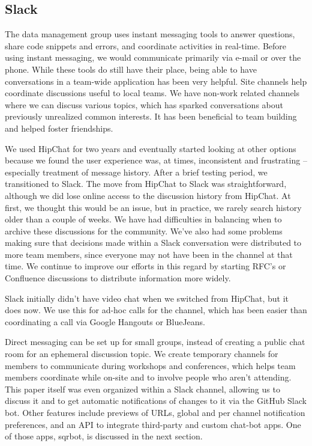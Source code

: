 \subsection{Slack}
\label{sec:slack}

The data management group uses instant messaging tools  to answer questions,
share code snippets and errors, and coordinate activities in real-time.
Before using instant messaging, we would communicate primarily via e-mail or
over the phone. While these tools do still have their place, being able to have
conversations in a team-wide application has been very helpful.
Site channels help coordinate discussions
useful to local teams.  We have non-work related channels where we can
discuss various topics, which has sparked conversations about previously
unrealized common interests. It has been beneficial to team building and
helped foster friendships.


We used HipChat for two years and eventually started looking at other options
because we found the user experience was, at times, inconsistent and
frustrating -- especially treatment of message history.
After a brief testing period, we transitioned to Slack.
The move from HipChat to Slack was straightforward,
although we did lose online access to the discussion history from HipChat.  At first, we
thought this would be an issue, but in practice, we rarely search history older
than a couple of weeks.  We have had difficulties in balancing when to
archive these discussions for the community.  We've also had some problems
making sure that decisions made within a Slack conversation were
distributed to more team members, since everyone may not have been in the
channel at that time.  We continue to improve our efforts in this regard by
starting RFC's or Confluence discussions to distribute information more widely.

Slack initially didn't have video chat when we switched from HipChat, but
it does now.  We use this for ad-hoc calls for the channel, which has been
easier than coordinating a call via Google Hangouts or BlueJeans.

Direct messaging can be set up for small groups,
instead of creating a public chat room for an ephemeral discussion topic.
We create temporary channels for members to communicate during workshops and
conferences, which helps team members coordinate while on-site and to involve
people who aren't attending.  This paper itself was even organized
within a Slack channel, allowing us to discuss it and to get automatic
notifications of changes to it via the GitHub Slack bot.
Other features include previews of URLs, global and per channel notification preferences, and an
API to integrate third-party and custom chat-bot apps. One of those apps,
sqrbot, is discussed in the next section.


